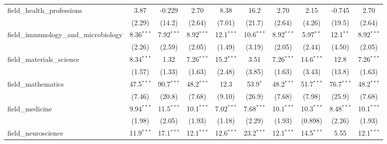 \begin{tabular}{lccccccccc}
   field\_health\_professions                                  & 3.87          & -0.229         & 2.70          & 8.38          & 16.2          & 2.70          & 2.15          & -0.745         & 2.70\\   
                                                               & (2.29)        & (14.2)         & (2.64)        & (7.01)        & (21.7)        & (2.64)        & (4.26)        & (19.5)         & (2.64)\\   
   field\_immunology\_and\_microbiology                        & 8.36$^{***}$  & 7.92$^{***}$   & 8.92$^{***}$  & 12.1$^{***}$  & 10.6$^{***}$  & 8.92$^{***}$  & 5.97$^{**}$   & 12.1$^{**}$    & 8.92$^{***}$\\   
                                                               & (2.26)        & (2.59)         & (2.05)        & (1.49)        & (3.19)        & (2.05)        & (2.44)        & (4.50)         & (2.05)\\   
   field\_materials\_science                                   & 8.34$^{***}$  & 1.32           & 7.26$^{***}$  & 15.2$^{***}$  & 3.51          & 7.26$^{***}$  & 14.6$^{***}$  & 12.8           & 7.26$^{***}$\\   
                                                               & (1.57)        & (1.33)         & (1.63)        & (2.48)        & (3.85)        & (1.63)        & (3.43)        & (13.8)         & (1.63)\\   
   field\_mathematics                                          & 47.5$^{***}$  & 90.7$^{***}$   & 48.2$^{***}$  & 12.3          & 53.9$^{*}$    & 48.2$^{***}$  & 51.7$^{***}$  & 76.7$^{***}$   & 48.2$^{***}$\\   
                                                               & (7.46)        & (20.8)         & (7.68)        & (9.10)        & (26.9)        & (7.68)        & (7.98)        & (25.9)         & (7.68)\\   
   field\_medicine                                             & 9.94$^{***}$  & 11.5$^{***}$   & 10.1$^{***}$  & 7.02$^{***}$  & 7.68$^{***}$  & 10.1$^{***}$  & 10.3$^{***}$  & 8.48$^{***}$   & 10.1$^{***}$\\   
                                                               & (1.98)        & (2.05)         & (1.93)        & (1.18)        & (2.29)        & (1.93)        & (0.898)       & (2.26)         & (1.93)\\   
   field\_neuroscience                                         & 11.9$^{***}$  & 17.1$^{***}$   & 12.1$^{***}$  & 12.6$^{***}$  & 23.2$^{***}$  & 12.1$^{***}$  & 14.5$^{***}$  & 5.55           & 12.1$^{***}$\\   

\end{tabular}
